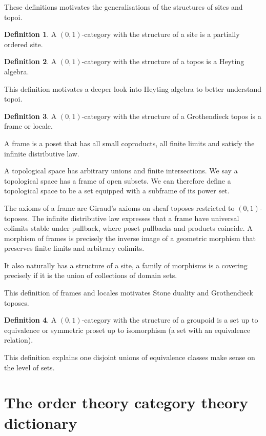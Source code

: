\documentclass[10pt]{article}
\theoremstyle{plain}%
\theoremstyle{definition}
\newtheorem{definition}{Definition}[section]
\theoremstyle{remark}
\begin{document}
These definitions motivates the generalisations of the structures of sites and topoi.

\begin{definition}
	A $(0,1)$-category with the structure of a site is a partially ordered site. 
\end{definition}

\begin{definition}
	A $(0,1)$-category with the structure of a topos is a Heyting algebra. 
\end{definition}

This definition motivates a deeper look into Heyting algebra to better understand topoi.

\begin{definition}
	A $(0,1)$-category with the structure of a Grothendieck topos is a frame or locale.
	
	A frame is a poset that has all small coproducts, all finite limits and satisfy the infinite distributive law.

	A topological space has arbitrary unions and finite intersections. We say a topological space has a frame of open subsets. We can therefore define a topological space to be a set equipped with a subframe of its power set.
\end{definition}

The axioms of a frame are Giraud's axioms on sheaf toposes restricted to $(0,1)$-toposes. The infinite distributive law expresses that a frame have universal colimits stable under pullback, where poset pullbacks and products coincide. A morphism of frames is precisely the inverse image of a geometric morphism that preserves finite limits and arbitrary colimits.

It also naturally has a structure of a site, a family of morphisms is a covering precisely if it is the union of collections of domain sets.

This definition of frames and locales motivates Stone duality and Grothendieck toposes.

\begin{definition}
	A $(0,1)$-category with the structure of a groupoid is a set up to equivalence or symmetric proset up to isomorphism (a set with an equivalence relation).
\end{definition}

This definition explains one disjoint unions of equivalence classes make sense on the level of sets.

\section{The order theory category theory dictionary}
\end{document}
